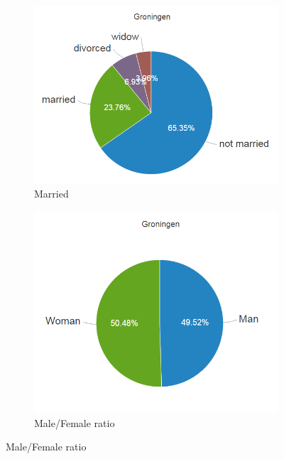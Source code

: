 \documentclass[a4paper,twoside,11pt]{article}
\begin{document}
\begin{figure}
        \begin{subfigure}[b]{0.23\textwidth}
                \includegraphics[width=\textwidth]{Visualization/PieChartMarried.png}
                \caption{Married}
                \label{fig:Married}
        \end{subfigure}
        \begin{subfigure}[b]{0.23\textwidth}
                \includegraphics[width=\textwidth]{Visualization/PieChartRatio.png}
                \caption{Male/Female ratio}
                \label{fig:Ratio}
        \end{subfigure}

\end{figure}
\end{document}
